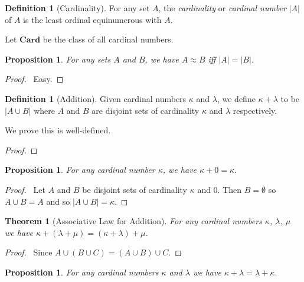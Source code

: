 \documentclass{book}
\let\qed\relax
\newtheorem{prop}[ax]{Proposition}
\newtheorem{thm}[ax]{Theorem}
\theoremstyle{definition}
\newtheorem{df}[ax]{Definition}
\begin{document}
\begin{df}[Cardinality]
For any set $A$, the \emph{cardinality} or \emph{cardinal number} $|A|$ of $A$ is the least ordinal equinumerous with $A$.

Let $\mathbf{Card}$ be the class of all cardinal numbers.
\end{df}

\begin{prop}
For any sets $A$ and $B$, we have $A \approx B$ iff $|A| = |B|$.
\end{prop}

\begin{proof}
\pf\ Easy. \qed
\end{proof}

\begin{df}[Addition]
Given cardinal numbers $\kappa$ and $\lambda$, we define $\kappa + \lambda$ to be $|A \cup B|$ where $A$ and $B$ are disjoint sets of cardinality $\kappa$ and $\lambda$ respectively.

We prove this is well-defined.
\end{df}

\begin{proof}
\pf
{}
\qed
\end{proof}

\begin{prop}
For any cardinal number $\kappa$, we have $\kappa + 0 = \kappa$.
\end{prop}

\begin{proof}
\pf\ Let $A$ and $B$ be disjoint sets of cardinality $\kappa$ and 0. Then $B = \emptyset$ so $A \cup B = A$ and so $|A \cup B| = \kappa$. \qed
\end{proof}

\begin{thm}[Associative Law for Addition]
For any cardinal numbers $\kappa$, $\lambda$, $\mu$ we have $\kappa + (\lambda + \mu) = (\kappa + \lambda) + \mu$.
\end{thm}

\begin{proof}
\pf\ Since $A \cup (B \cup C) = (A \cup B) \cup C$. \qed
\end{proof}

\begin{prop}
For any cardinal numbers $\kappa$ and $\lambda$ we have $\kappa + \lambda = \lambda + \kappa$.
\end{prop}
\end{document}
